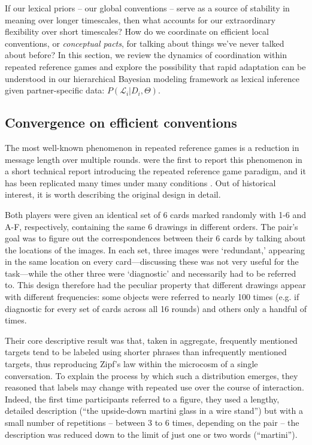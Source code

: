 If our lexical priors -- our global conventions -- serve as a source of stability in meaning over longer timescales, then what accounts for our extraordinary flexibility  over short timescales? How do we coordinate on efficient local conventions, or \emph{conceptual pacts}, for talking about things we've never talked about before? In this section, we review the dynamics of coordination within repeated reference games and explore the possibility that rapid adaptation can be understood in our hierarchical Bayesian modeling framework as lexical inference given partner-specific data: $P(\mathcal{L}_i | D_i, \Theta)$. 

\subsection{Convergence on efficient conventions}

The most well-known phenomenon in repeated reference games is a reduction in message length over multiple rounds.  were the first to report this phenomenon in a short technical report introducing the repeated reference game paradigm, and it has been replicated many times under many conditions \cite<most notably by>[in a much more streamlined experimental design using tangram shapes]{ClarkWilkesGibbs86_ReferringCollaborative}. Out of historical interest, it is worth describing the original design in detail. 

Both players were given an identical set of 6 cards marked randomly with 1-6 and A-F, respectively, containing the same 6 drawings in different orders. The pair's goal was to figure out the correspondences between their 6 cards by talking about the locations of the images. In each set, three images were `redundant,' appearing in the same location on every card---discussing these was not very useful for the task---while the other three were `diagnostic' and necessarily had to be referred to. This design therefore had the peculiar property that different drawings appear with different frequencies: some objects were referred to nearly 100 times (e.g. if diagnostic for every set of cards across all 16 rounds) and others only a handful of times. 

Their core descriptive result was that, taken in aggregate, frequently mentioned targets tend to be labeled using shorter phrases than infrequently mentioned targets, thus reproducing Zipf's law within the microcosm of a single conversation. To explain the process by which such a distribution emerges, they reasoned that labels may change with repeated use over the course of interaction. Indeed, the first time participants referred to a figure, they used a lengthy, detailed description (``the upside-down martini glass in a wire stand'') but with a small number of repetitions -- between 3 to 6 times, depending on the pair -- the description was reduced down to the limit of just one or two words (``martini''). 

